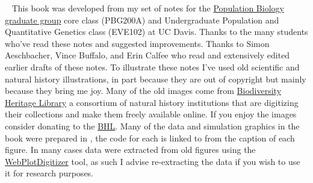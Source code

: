 \documentclass{tufte-book}
\begin{document}
\begin{fullwidth}
~\vfill
\thispagestyle{empty}
\setlength{\parindent}{0pt}
\setlength{\parskip}{\baselineskip}
  \small This book was developed from my set of notes for the \href{http://www-eve.ucdavis.edu/eve/pbg/}{Population
  Biology graduate group} core class (PBG200A) and Undergraduate Population and
  Quantitative Genetics class (EVE102) at UC Davis. Thanks to the many
  students who've read these notes and suggested improvements. Thanks
 to Simon Aeschbacher, Vince Buffalo, and Erin Calfee who read
 and extensively edited earlier drafts of these notes. To illustrate these notes I've used old scientific and natural history illustrations, in part
 because they are out of copyright but mainly because they bring me
 joy. Many of the old images come from
 \href{https://www.biodiversitylibrary.org/}{Biodiversity Heritage
   Library} a consortium of natural history institutions that are
 digitizing their collections and make them freely available
 online. If you enjoy the images consider donating to the
 \href{http://library.si.edu/donate-bhl}{BHL}. Many of the data and
 simulation graphics in the book were prepared in \citet{Rstats},
 the code for each is linked to from the caption of each figure. In many cases
 data were extracted from old figures using the
 \href{https://automeris.io/WebPlotDigitizer/}{WebPlotDigitizer}
 tool, as such I advise re-extracting the data if you wish to use it
 for research purposes.
\end{fullwidth}

\tableofcontents

\linenumbers
\modulolinenumbers[2]




%





%



\end{document}
